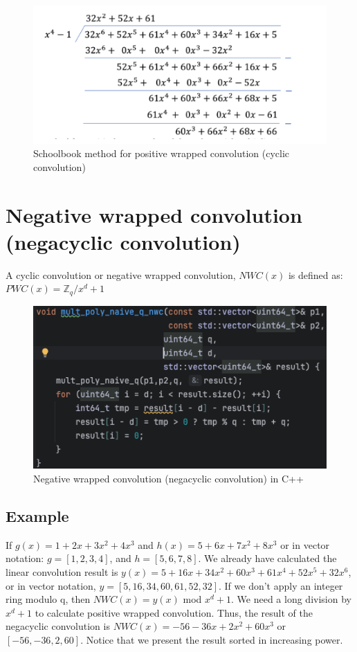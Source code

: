 \documentclass{techrep}
\theoremstyle{definition}
\theoremstyle{plain}
\newcommand{\Z}{\mathbb{Z}}
\begin{document}
	\begin{figure}[H]
		\centering
		\includegraphics[width=.7\columnwidth]{fig/PWC_1.png}
		\caption{Schoolbook method for positive wrapped convolution (cyclic convolution)}
		\label{fig:PWC_1}
	\end{figure}

	\section{Negative wrapped convolution (negacyclic convolution)}
	A cyclic convolution or negative wrapped convolution, $NWC(x)$ is defined as: $PWC(x) = \Z_{q}/x^d + 1$

	\begin{figure}[H]
		\centering
		\includegraphics[width=.9\columnwidth]{fig/NWC_cplus.png}
		\caption{Negative wrapped convolution (negacyclic convolution) in C++}
		\label{fig:NWC_cplus}
	\end{figure}

	\subsection{Example}
	If $g(x) = 1 + 2x + 3x^2 + 4x^3$ and $h(x) = 5 + 6x + 7x^2 + 8x^3$ or in vector notation:  $g = [1, 2, 3, 4]$, and $h = [5, 6, 7, 8]$. We already have calculated the linear convolution result is $y(x) = 5 + 16x + 34x^2 + 60x^3 + 61x^4 + 52x^5 + 32x^6$, or in vector notation, $y = [5, 16, 34, 60, 61, 52, 32]$. If we don't apply an integer ring modulo q, then $NWC(x) = y(x)$ mod $x^d + 1$.  We need a long division by $x^d + 1$ to calculate positive wrapped convolution. Thus, the result of the negacyclic convolution is $NWC(x) = -56 -36x + 2x^2 + 60x^3$ or $[-56, -36, 2, 60]$. Notice that we present the result sorted in increasing power.
\end{document}
